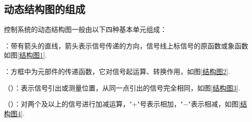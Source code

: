 \subsection{动态结构图的组成}
\noindent 控制系统的动态结构图一般由以下四种基本单元组成：

\begin{myitemize}
	\item {}：带有箭头的直线，箭头表示信号传递的方向，信号线上标信号的原函数或象函数如图\ref{结构图1}.\vspace*{-0.5em}
	\item {}：方框中为元部件的传递函数，它对信号起运算、转换作用，如图\ref{结构图2}.\vspace*{-0.5em}
	\item {}（）：表示信号引出或测量位置，从同一点引出的信号完全相同，如图\ref{结构图3}.\vspace*{-0.5em}
	\item {}（）：对两个及以上的信号进行加减运算，"$+$"号表示相加，"$-$"表示相减，如图\ref{结构图4}.\vspace*{0.3em}
\end{myitemize}

